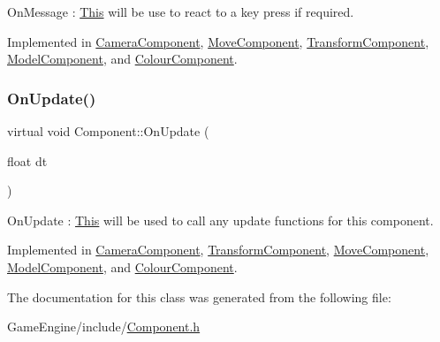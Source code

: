 On\+Message \+: \mbox{\hyperlink{class_this}{This}} will be use to react to a key press if required. 

Implemented in \mbox{\hyperlink{class_camera_component_a1cd7e6036568be5bf45d249d8f96a596}{Camera\+Component}}, \mbox{\hyperlink{class_move_component_a27146b88beda6223ed9f4a82c47a917a}{Move\+Component}}, \mbox{\hyperlink{class_transform_component_ac250c4b7e47e639d0f8693d04c9b5051}{Transform\+Component}}, \mbox{\hyperlink{class_model_component_a48d6170e857f323839039ce54e9418e1}{Model\+Component}}, and \mbox{\hyperlink{class_colour_component_a40b859f0c124ddbe92ff1e53bdb398a0}{Colour\+Component}}.

\mbox{\label{class_component_ab71d7f4b6d8792287a9b0c9e045acbe0}} 
\subsubsection{\texorpdfstring{On\+Update()}{OnUpdate()}}
{\footnotesize\ttfamily virtual void Component\+::\+On\+Update (\begin{DoxyParamCaption}\item[{float}]{dt }\end{DoxyParamCaption})\hspace{0.3cm}{\ttfamily [pure virtual]}}

On\+Update \+: \mbox{\hyperlink{class_this}{This}} will be used to call any update functions for this component. 

Implemented in \mbox{\hyperlink{class_camera_component_aa0391037fd478ea1a602835ea64091ba}{Camera\+Component}}, \mbox{\hyperlink{class_transform_component_ab763f5af77fcb5eee0e725c219901fa3}{Transform\+Component}}, \mbox{\hyperlink{class_move_component_aac8549ecd0670b2b8830d43019d58ea4}{Move\+Component}}, \mbox{\hyperlink{class_model_component_a5def59776319943854fb5da3dc515051}{Model\+Component}}, and \mbox{\hyperlink{class_colour_component_ae45e91aebb680031bb1328c7c189ea15}{Colour\+Component}}.



The documentation for this class was generated from the following file\+:\begin{DoxyCompactItemize}
\item 
Game\+Engine/include/\mbox{\hyperlink{_component_8h}{Component.\+h}}\end{DoxyCompactItemize}
